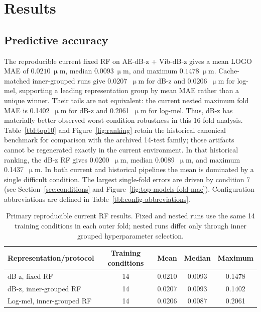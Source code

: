 \section{Results}\label{results}

\subsection{Predictive accuracy}\label{predictive-accuracy}

The reproducible current fixed RF on AE-dB-z + Vib-dB-z gives a mean
LOGO MAE of \(0.0210~\upmu\)m, median \(0.0093~\upmu\)m, and maximum
\(0.1478~\upmu\)m. Cache-matched inner-grouped runs give 0.0207~\(\upmu\)m
for dB-z and 0.0206~\(\upmu\)m for log-mel, supporting a leading
representation group by mean MAE rather than a unique winner. Their tails are
not equivalent: the current nested maximum fold MAE is 0.1402~\(\upmu\)m for
dB-z and 0.2061~\(\upmu\)m for log-mel. Thus, dB-z has materially better
observed worst-condition robustness in this 16-fold analysis. Table~\ref{tbl:top10}
and Figure~\ref{fig:ranking} retain the historical canonical benchmark for
comparison with the archived 14-test family; those artifacts cannot be
regenerated exactly in the current environment. In that historical ranking,
the dB-z RF gives 0.0200~\(\upmu\)m, median 0.0089~\(\upmu\)m, and maximum
0.1437~\(\upmu\)m. In both current and historical pipelines the mean is dominated by a single
difficult condition. The
largest single-fold errors are driven by condition 7 (see
Section~\ref{sec:conditions} and Figure~\ref{fig:top-models-fold-mae}).
Configuration abbreviations are defined in
Table~\ref{tbl:config-abbreviations}.

\begin{table}[htbp]
\centering
\caption{Primary reproducible current RF results. Fixed and nested runs use
the same 14 training conditions in each outer fold; nested runs differ only
through inner grouped hyperparameter selection.}
\label{tbl:current-rf-primary}
\begin{tabular}{@{}lcccc@{}}
\toprule
Representation/protocol & Training conditions & Mean & Median & Maximum \\
\midrule
dB-z, fixed RF & 14 & 0.0210 & 0.0093 & 0.1478 \\
dB-z, inner-grouped RF & 14 & 0.0207 & 0.0093 & 0.1402 \\
Log-mel, inner-grouped RF & 14 & 0.0206 & 0.0087 & 0.2061 \\
\bottomrule
\end{tabular}
\end{table}

